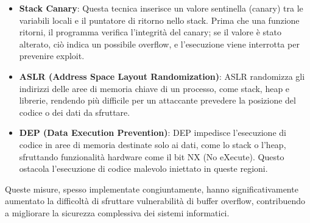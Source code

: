 \documentclass[main.tex]{subfiles}
\begin{document}
\begin{itemize}
    \item \textbf{Stack Canary}: Questa tecnica inserisce un valore sentinella (canary) tra le variabili locali e il puntatore di ritorno nello stack. Prima che una funzione ritorni, il programma verifica l'integrità del canary; se il valore è stato alterato, ciò indica un possibile overflow, e l'esecuzione viene interrotta per prevenire exploit. 
    \item \textbf{ASLR (Address Space Layout Randomization)}: ASLR randomizza gli indirizzi delle aree di memoria chiave di un processo, come stack, heap e librerie, rendendo più difficile per un attaccante prevedere la posizione del codice o dei dati da sfruttare. 
    \item \textbf{DEP (Data Execution Prevention)}: DEP impedisce l'esecuzione di codice in aree di memoria destinate solo ai dati, come lo stack o l'heap, sfruttando funzionalità hardware come il bit NX (No eXecute). Questo ostacola l'esecuzione di codice malevolo iniettato in queste regioni.
\end{itemize}
Queste misure, spesso implementate congiuntamente, hanno significativamente aumentato la difficoltà di sfruttare vulnerabilità di buffer overflow, contribuendo a migliorare la sicurezza complessiva dei sistemi informatici.
\end{document}

